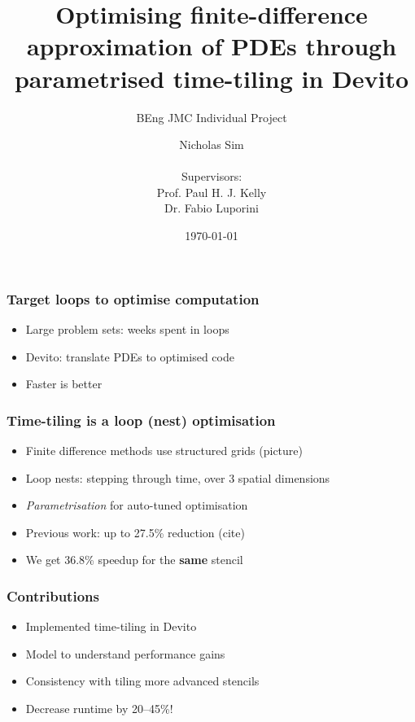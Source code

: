 \documentclass{beamer}
\begin{document}
\title{Optimising finite-difference approximation of PDEs through parametrised time-tiling in Devito}
\subtitle{BEng JMC Individual Project}

\author{Nicholas Sim\\
~\\
{\normalsize Supervisors:}\\
Prof. Paul H. J. Kelly\\
Dr. Fabio Luporini}

\date{\today}

\frame{\titlepage}



\begin{frame}
\frametitle{Target loops to optimise computation}

\begin{itemize}
	\item Large problem sets: weeks spent in loops
	\item Devito: translate PDEs to optimised code
	\item Faster is better
\end{itemize}
\end{frame}



\begin{frame}
\frametitle{Time-tiling is a loop (nest) optimisation}

\begin{itemize}
	\item Finite difference methods use structured grids (picture)
	\item Loop nests: stepping through time, over 3 spatial dimensions
	\item \emph{Parametrisation} for auto-tuned optimisation
	\item Previous work: up to 27.5\% reduction (cite)
	\item We get 36.8\% speedup for the \textbf{same} stencil
\end{itemize}
\end{frame}



\begin{frame}
\frametitle{Contributions}

\begin{itemize}
	\item Implemented time-tiling in Devito
	\item Model to understand performance gains
	\item Consistency with tiling more advanced stencils
	\item Decrease runtime by 20--45\%!
\end{itemize}
\end{frame}
\end{document}
